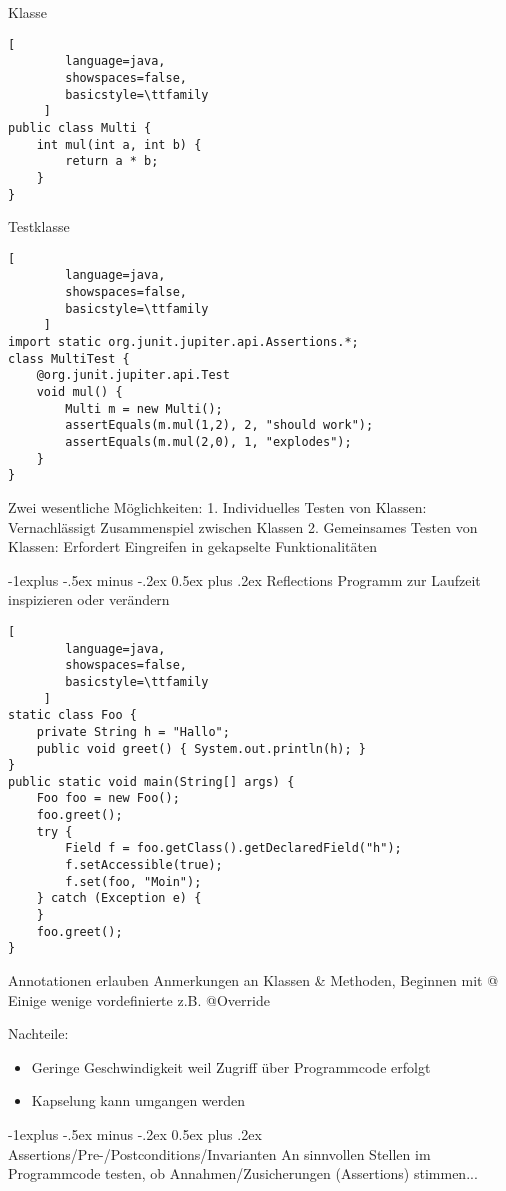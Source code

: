 \documentclass[10pt]{article}
\makeatletter
\renewcommand{\subsection}{\@startsection{subsection}{2}{0mm}%
                                {-1explus -.5ex minus -.2ex}%
                                {0.5ex plus .2ex}%
                                {\normalfont\normalsize\bfseries}}
\makeatother
\begin{document}
Klasse
\begin{lstlisting}[
        language=java,
        showspaces=false,
        basicstyle=\ttfamily
     ]
public class Multi {
    int mul(int a, int b) {
        return a * b;
    }
}
\end{lstlisting}
Testklasse
\begin{lstlisting}[
        language=java,
        showspaces=false,
        basicstyle=\ttfamily
     ]
import static org.junit.jupiter.api.Assertions.*;
class MultiTest {
    @org.junit.jupiter.api.Test
    void mul() {
        Multi m = new Multi();
        assertEquals(m.mul(1,2), 2, "should work");
        assertEquals(m.mul(2,0), 1, "explodes");
    }
}
\end{lstlisting}

Zwei wesentliche Möglichkeiten:
1. Individuelles Testen von Klassen: Vernachlässigt Zusammenspiel zwischen Klassen
2. Gemeinsames Testen von Klassen: Erfordert Eingreifen in gekapselte Funktionalitäten



\subsection{Reflections}
Programm zur Laufzeit inspizieren oder verändern

\begin{lstlisting}[
        language=java,
        showspaces=false,
        basicstyle=\ttfamily
     ]
static class Foo {
    private String h = "Hallo";
    public void greet() { System.out.println(h); }
}
public static void main(String[] args) {
    Foo foo = new Foo();
    foo.greet();
    try {
        Field f = foo.getClass().getDeclaredField("h");
        f.setAccessible(true);
        f.set(foo, "Moin");
    } catch (Exception e) {
    }
    foo.greet();
}
\end{lstlisting}
Annotationen erlauben Anmerkungen an Klassen \& Methoden, Beginnen mit @
Einige wenige vordefinierte z.B. @Override

Nachteile:
\begin{itemize}
  \item Geringe Geschwindigkeit weil Zugriff über Programmcode erfolgt
  \item Kapselung kann umgangen werden
\end{itemize}




\subsection{Assertions/Pre-/Postconditions/Invarianten}
An sinnvollen Stellen im Programmcode testen, ob Annahmen/Zusicherungen (Assertions) stimmen...
\end{document}
